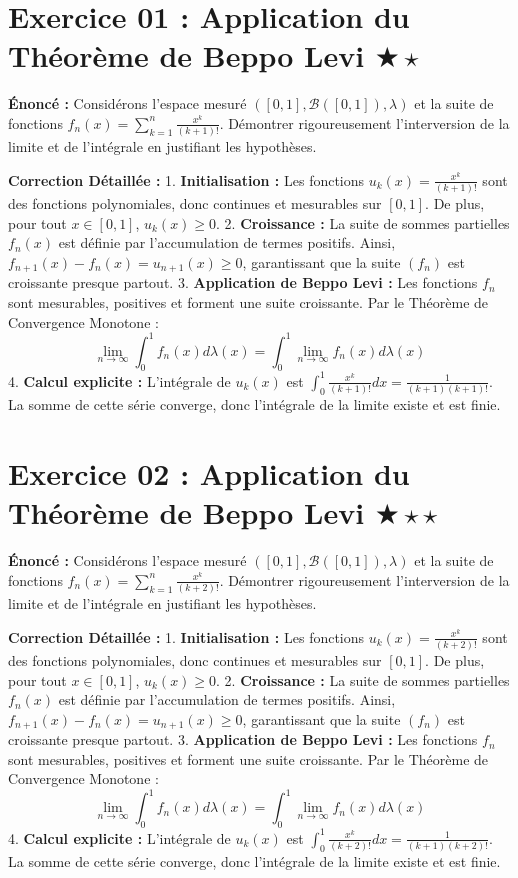 \documentclass[11pt,a4paper]{article}
\begin{document}
\section*{Exercice 01 : Application du Théorème de Beppo Levi \quad $\bigstar\star$}

\textbf{Énoncé :}
Considérons l'espace mesuré $([0, 1], \mathcal{B}([0, 1]), \lambda)$ et la suite de fonctions $f_n(x) = \sum_{k=1}^n \frac{x^k}{(k+1)!}$.
Démontrer rigoureusement l'interversion de la limite et de l'intégrale en justifiant les hypothèses.

\textbf{Correction Détaillée :}
1. \textbf{Initialisation :}
   Les fonctions $u_k(x) = \frac{x^k}{(k+1)!}$ sont des fonctions polynomiales, donc continues et mesurables sur $[0, 1]$. De plus, pour tout $x \in [0, 1]$, $u_k(x) \ge 0$.
2. \textbf{Croissance :}
   La suite de sommes partielles $f_n(x)$ est définie par l'accumulation de termes positifs. Ainsi, $f_{n+1}(x) - f_n(x) = u_{n+1}(x) \ge 0$, garantissant que la suite $(f_n)$ est croissante presque partout.
3. \textbf{Application de Beppo Levi :}
   Les fonctions $f_n$ sont mesurables, positives et forment une suite croissante. Par le Théorème de Convergence Monotone :
   $$\lim_{n \to \infty} \int_0^1 f_n(x) d\lambda(x) = \int_0^1 \lim_{n \to \infty} f_n(x) d\lambda(x)$$
4. \textbf{Calcul explicite :}
   L'intégrale de $u_k(x)$ est $\int_0^1 \frac{x^k}{(k+1)!} dx = \frac{1}{(k+1)(k+1)!}$.
   La somme de cette série converge, donc l'intégrale de la limite existe et est finie.

\vspace{1cm}

\section*{Exercice 02 : Application du Théorème de Beppo Levi \quad $\bigstar\star\star$}

\textbf{Énoncé :}
Considérons l'espace mesuré $([0, 1], \mathcal{B}([0, 1]), \lambda)$ et la suite de fonctions $f_n(x) = \sum_{k=1}^n \frac{x^k}{(k+2)!}$.
Démontrer rigoureusement l'interversion de la limite et de l'intégrale en justifiant les hypothèses.

\textbf{Correction Détaillée :}
1. \textbf{Initialisation :}
   Les fonctions $u_k(x) = \frac{x^k}{(k+2)!}$ sont des fonctions polynomiales, donc continues et mesurables sur $[0, 1]$. De plus, pour tout $x \in [0, 1]$, $u_k(x) \ge 0$.
2. \textbf{Croissance :}
   La suite de sommes partielles $f_n(x)$ est définie par l'accumulation de termes positifs. Ainsi, $f_{n+1}(x) - f_n(x) = u_{n+1}(x) \ge 0$, garantissant que la suite $(f_n)$ est croissante presque partout.
3. \textbf{Application de Beppo Levi :}
   Les fonctions $f_n$ sont mesurables, positives et forment une suite croissante. Par le Théorème de Convergence Monotone :
   $$\lim_{n \to \infty} \int_0^1 f_n(x) d\lambda(x) = \int_0^1 \lim_{n \to \infty} f_n(x) d\lambda(x)$$
4. \textbf{Calcul explicite :}
   L'intégrale de $u_k(x)$ est $\int_0^1 \frac{x^k}{(k+2)!} dx = \frac{1}{(k+1)(k+2)!}$.
   La somme de cette série converge, donc l'intégrale de la limite existe et est finie.
\end{document}
